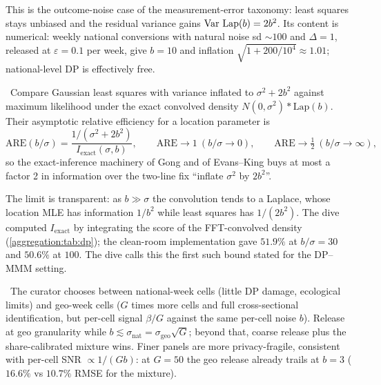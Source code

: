 This is the outcome-noise case of the measurement-error taxonomy: least squares stays unbiased and the residual variance gains $\operatorname{Var}\,\mathrm{Lap}(b) = 2b^2$. Its content is numerical: weekly national conversions with natural noise sd $\sim 100$ and $\Delta = 1$, released at $\varepsilon = 0.1$ per week, give $b = 10$ and inflation $\sqrt{1 + 200/10^4} \approx 1.01$; national-level DP is effectively free.

\begin{proposition}\label{aggregation:prop:are}
\tagEstablished\ Compare Gaussian least squares with variance inflated to $\sigma^2 + 2b^2$ against maximum likelihood under the exact convolved density $N(0,\sigma^2) * \mathrm{Lap}(b)$. Their asymptotic relative efficiency for a location parameter is
\begin{equation}
\mathrm{ARE}(b/\sigma) = \frac{1/(\sigma^2 + 2b^2)}{I_{\mathrm{exact}}(\sigma,b)}, \qquad \mathrm{ARE} \to 1 \ (b/\sigma \to 0), \qquad \mathrm{ARE} \to \tfrac12 \ (b/\sigma \to \infty),
\label{eq:aggregation:are}
\end{equation}
so the exact-inference machinery of Gong and of Evans--King buys at most a factor 2 in information over the two-line fix ``inflate $\sigma^2$ by $2b^2$''.
\end{proposition}

The limit is transparent: as $b \gg \sigma$ the convolution tends to a Laplace, whose location MLE has information $1/b^2$ while least squares has $1/(2b^2)$. The dive computed $I_{\mathrm{exact}}$ by integrating the score of the FFT-convolved density (\cref{aggregation:tab:dp}); the clean-room implementation gave $51.9\%$ at $b/\sigma = 30$ and $50.6\%$ at $100$. The dive calls this the first such bound stated for the DP--MMM setting.

\begin{law}\label{aggregation:law:frontier}
\tagNumerical\ The curator chooses between national-week cells (little DP damage, ecological limits) and geo-week cells ($G$ times more cells and full cross-sectional identification, but per-cell signal $\beta/G$ against the same per-cell noise $b$). Release at geo granularity while $b \lesssim \sigma_{\mathrm{nat}} = \sigma_{\mathrm{geo}}\sqrt{G}$; beyond that, coarse release plus the share-calibrated mixture wins. Finer panels are more privacy-fragile, consistent with per-cell SNR $\propto 1/(Gb)$: at $G = 50$ the geo release already trails at $b = 3$ ($16.6\%$ vs $10.7\%$ RMSE for the mixture).
\end{law}

